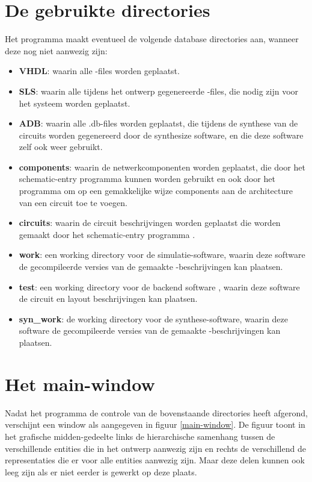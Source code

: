\section{De gebruikte directories}
Het programma maakt eventueel de volgende database directories aan, wanneer deze
nog niet aanwezig zijn:
\begin{itemize}
\item {\bf VHDL}: waarin alle -files worden geplaatst.
\item {\bf SLS}: waarin alle tijdens het ontwerp gegenereerde -files, die
            nodig zijn voor het  systeem worden geplaatst.
\item {\bf ADB}: waarin alle .db-files worden geplaatst, die tijdens de
            synthese van de circuits worden gegenereerd door de synthesize
            software, en die deze software zelf ook weer gebruikt.
\item {\bf components}: waarin de netwerkcomponenten worden geplaatst, die door
                  het schematic-entry programma kunnen worden gebruikt en ook
                  door het programma  om op een gemak\-kelijke
                  wijze components aan de architecture van een circuit toe
                  te voegen.
\item {\bf circuits}: waarin de circuit beschrijvingen worden geplaatst die worden
                gemaakt door het schematic-entry programma .
\item {\bf work}: een working directory voor de  simulatie-software, waarin
            deze software de gecompileerde versies van de gemaakte
            -beschrijvingen kan plaatsen.
\item {\bf test}: een working directory voor de backend software , waarin
            deze software de circuit en layout beschrijvingen kan plaatsen.
\item {\bf syn\_work}: de working directory voor de synthese-software, waarin
            deze software de gecompileerde versies van de gemaakte
            -beschrijvingen kan plaatsen.
\end{itemize}

\section{Het main-window}
Nadat het programma 
de controle van de bovenstaande directories heeft afgerond,
verschijnt een window als aangegeven in figuur \ref{main-window}.
De figuur toont in het grafische midden-gedeelte links de hierarchische
samenhang tussen de verschillende entities die in het ontwerp aanwezig zijn
en rechts de verschillend de representaties die er voor alle entities
aanwezig zijn.
Maar deze delen kunnen ook leeg zijn als er niet eerder is gewerkt op deze plaats.

